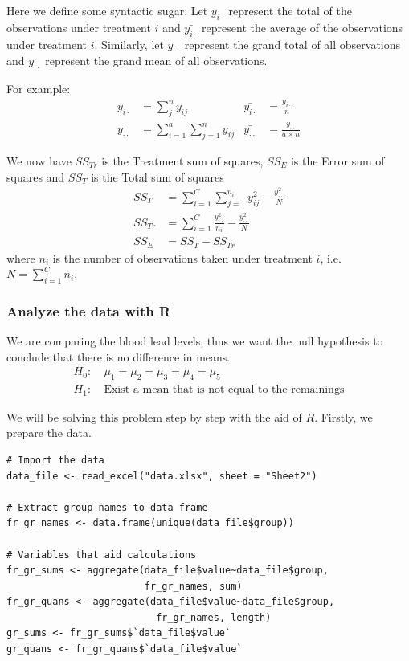 \documentclass[a4paper]{article}
\numberwithin{equation}{section}
\begin{document}
Here we define some syntactic sugar. Let \(y_{i\cdot}\) represent the total of the observations under treatment \(i\) and \(\bar{y_{i\cdot}}\) represent the average of the observations under treatment \(i\).
Similarly, let \(y_{\cdot\cdot}\) represent the grand total of all observations and \(\bar{y_{\cdot\cdot}}\) represent the grand mean of all observations.

For example:
\begin{align*}
  y_{i\cdot}     & = \sum_{j}^{n} y_{ij}                  & \bar{y_{i\cdot}}     & = \frac{y_{i\cdot}}{n}              \\
  y_{\cdot\cdot} & = \sum_{i=1}^{a} \sum_{j=1}^{n} y_{ij} & \bar{y_{\cdot\cdot}} & = \frac{y_{\cdot\cdot}}{a \times n}
\end{align*}

We now have \(SS_{Tr}\) is the Treatment sum of squares, \(SS_{E}\) is the Error sum of squares and \(SS_{T}\) is the Total sum of squares
\begin{align*}
  SS_{T}  & = \sum_{i=1}^{C} \sum_{j=1}^{n_i} y_{ij}^2 - \frac{y_{\cdot\cdot}^2}{N}  \\
  SS_{Tr} & = \sum_{i=1}^{C} \frac{y_{i\cdot}^{2}}{n_i} - \frac{y_{\cdot\cdot}^2}{N} \\
  SS_{E}  & = SS_{T} - SS_{Tr}
\end{align*}
where \(n_i\) is the number of observations taken under treatment \(i\), i.e. \(N = \sum_{i=1}^{C} n_i\).

\subsubsection{Analyze the data with R}
We are comparing the blood lead levels, thus we want the null hypothesis to conclude that there is no difference in means.
\begin{align*}
  H_0: & \ \mu_1 = \mu_2 = \mu_3 = \mu_4 = \mu_5                   \\
  H_1: & \ \text{Exist a mean that is not equal to the remainings}
\end{align*}

We will be solving this problem step by step with the aid of \(R\).
Firstly, we prepare the data.
\begin{mdframed}[leftline=false,rightline=false,backgroundcolor=magenta!10,nobreak=true]
  \begin{verbatim}
# Import the data
data_file <- read_excel("data.xlsx", sheet = "Sheet2")

# Extract group names to data frame
fr_gr_names <- data.frame(unique(data_file$group))

# Variables that aid calculations
fr_gr_sums <- aggregate(data_file$value~data_file$group,
                        fr_gr_names, sum)
fr_gr_quans <- aggregate(data_file$value~data_file$group,
                          fr_gr_names, length)
gr_sums <- fr_gr_sums$`data_file$value`
gr_quans <- fr_gr_quans$`data_file$value`
  \end{verbatim}
\end{mdframed}
\end{document}
